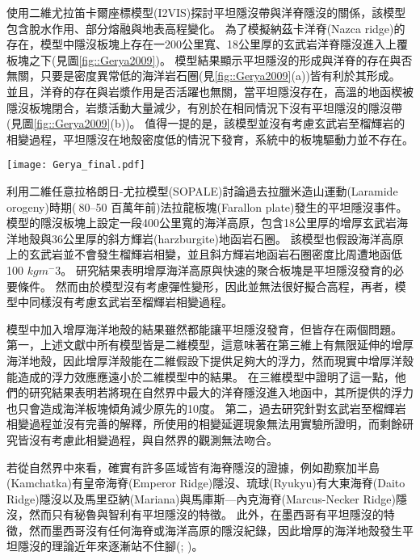 \citealp{Gerya2009}使用二維尤拉笛卡爾座標模型(I2VIS)探討平坦隱沒帶與洋脊隱沒的關係，該模型包含脫水作用、部分熔融與地表高程變化。
為了模擬納茲卡洋脊(Nazca ridge)的存在，模型中隱沒板塊上存在一200公里寬、18公里厚的玄武岩洋脊隱沒進入上覆板塊之下(見圖\ref{fig::Gerya2009})。
模型結果顯示平坦隱沒的形成與洋脊的存在與否無關，只要是密度異常低的海洋岩石圈(見\ref{fig::Gerya2009}(a))皆有利於其形成。
並且，洋脊的存在與岩漿作用是否活躍也無關，當平坦隱沒存在，高溫的地函楔被隱沒板塊閉合，岩漿活動大量減少，有別於在相同情況下沒有平坦隱沒的隱沒帶(見圖\ref{fig::Gerya2009}(b))。
值得一提的是，該模型並沒有考慮玄武岩至榴輝岩的相變過程，平坦隱沒在地殼密度低的情況下發育，系統中的板塊驅動力並不存在。


\begin{figure*}[ht!]
    \centering
    \texttt{[image: Gerya\_final.pdf]}
    \caption{\citealp{Gerya2009}中模型於第12個百萬年的結果。圖組(a)與圖組(b)分別為隱沒海洋地函岩石圈密度$3100 kgm^{-3}$與$3300 kgm^{-3}$的結果。(a)上圖與(b)上圖為包含洋脊隱沒的模型，(a)(b)下圖為不包含洋脊的模型，圖中白線為等溫線。其中，顏色代表不同岩相：1、2=大陸地殼、3、4=沈積物、5、6=玄武岩、7、8=輝長岩、9、10=無水地函、11=蛇紋岩、12、13、14=含水地函。
    }
    \label{fig::Gerya2009}
\end{figure*}

\citealp{Liu2016}利用二維任意拉格朗日-尤拉模型(SOPALE)討論過去拉臘米造山運動(Laramide orogeny)時期($~$80–50 百萬年前)法拉龍板塊(Farallon plate)發生的平坦隱沒事件。
模型的隱沒板塊上設定一段400公里寬的海洋高原，包含18公里厚的增厚玄武岩海洋地殼與36公里厚的斜方輝岩(harzburgite)地函岩石圈。
該模型也假設海洋高原上的玄武岩並不會發生榴輝岩相變，並且斜方輝岩地函岩石圈密度比周遭地函低100 $kg m^-3$。
研究結果表明增厚海洋高原與快速的聚合板塊是平坦隱沒發育的必要條件。
然而由於模型沒有考慮彈性變形，因此並無法很好擬合高程，再者，模型中同樣沒有考慮玄武岩至榴輝岩相變過程。

模型中加入增厚海洋地殼的結果雖然都能讓平坦隱沒發育，但皆存在兩個問題。
第一，上述文獻中所有模型皆是二維模型，這意味著在第三維上有無限延伸的增厚海洋地殼，因此增厚洋殼能在二維假設下提供足夠大的浮力，然而現實中增厚洋殼能造成的浮力效應應遠小於二維模型中的結果。
\citealp{florez2019impact}在三維模型中證明了這一點，他們的研究結果表明若將現在自然界中最大的洋脊隱沒進入地函中，其所提供的浮力也只會造成海洋板塊傾角減少原先的10度。
第二，過去研究針對玄武岩至榴輝岩相變過程並沒有完善的解釋，\citealp{van2002role}所使用的相變延遲現象無法用實驗所證明，而剩餘研究皆沒有考慮此相變過程，與自然界的觀測無法吻合。

若從自然界中來看，確實有許多區域皆有海脊隱沒的證據，例如勘察加半島(Kamchatka)有皇帝海脊(Emperor Ridge)隱沒、琉球(Ryukyu)有大東海脊(Daito Ridge)隱沒以及馬里亞納(Mariana)與馬庫斯—內克海脊(Marcus-Necker Ridge)隱沒，然而只有秘魯與智利有平坦隱沒的特徵。
此外，在墨西哥有平坦隱沒的特徵，然而墨西哥沒有任何海脊或海洋高原的隱沒紀錄，因此增厚的海洋地殼發生平坦隱沒的理論近年來逐漸站不住腳(\citealp{schellart2020control}; \citealp{Schellart2021})。

